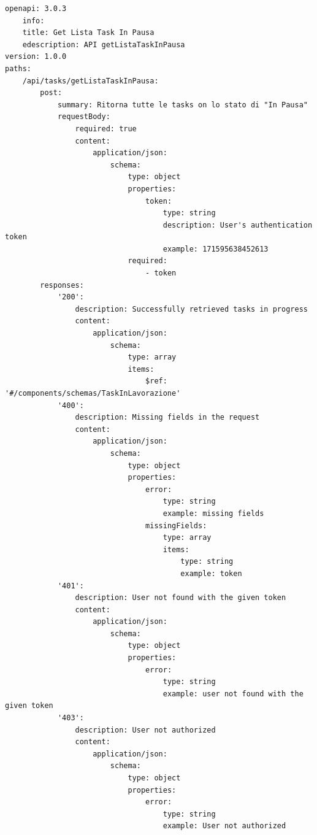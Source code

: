 \documentclass{report}
\begin{document}
\begin{verbatim}
openapi: 3.0.3
    info:
    title: Get Lista Task In Pausa
    edescription: API getListaTaskInPausa
version: 1.0.0
paths:
    /api/tasks/getListaTaskInPausa:
        post:
            summary: Ritorna tutte le tasks on lo stato di "In Pausa"
            requestBody:
                required: true
                content:
                    application/json:
                        schema:
                            type: object
                            properties:
                                token:
                                    type: string
                                    description: User's authentication token
                                    example: 171595638452613
                            required:
                                - token
        responses:
            '200':
                description: Successfully retrieved tasks in progress
                content:
                    application/json:
                        schema:
                            type: array
                            items:
                                $ref: '#/components/schemas/TaskInLavorazione'
            '400':
                description: Missing fields in the request
                content:
                    application/json:
                        schema:
                            type: object
                            properties:
                                error:
                                    type: string
                                    example: missing fields
                                missingFields:
                                    type: array
                                    items:
                                        type: string
                                        example: token
            '401':
                description: User not found with the given token
                content:
                    application/json:
                        schema:
                            type: object
                            properties:
                                error:
                                    type: string
                                    example: user not found with the given token
            '403':
                description: User not authorized
                content:
                    application/json:
                        schema:
                            type: object
                            properties:
                                error:
                                    type: string
                                    example: User not authorized
\end{verbatim}
\end{document}
